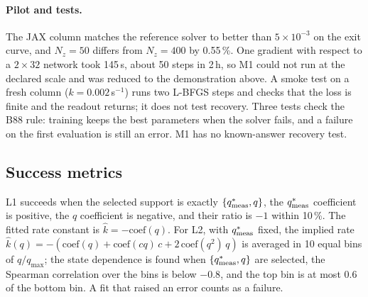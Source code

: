 \paragraph{Pilot and tests.} The JAX column matches the reference solver to better than
$5\times10^{-3}$ on the exit curve, and $N_z = 50$ differs from $N_z = 400$ by 0.55\,\%. One
gradient with respect to a $2\times32$ network took 145\,s, about 50 steps in 2\,h, so M1
could not run at the declared scale and was reduced to the demonstration above. A smoke test
on a fresh column ($k = 0.002$\,s$^{-1}$) runs two L-BFGS steps and checks that the loss is
finite and the readout returns; it does not test recovery. Three tests check the B88 rule:
training keeps the best parameters when the solver fails, and a failure on the first
evaluation is still an error. M1 has no known-answer recovery test.

\subsection*{Success metrics}
L1 succeeds when the selected support is exactly $\{q^{*}_{\mathrm{meas}}, q\}$, the $q^{*}_{\mathrm{meas}}$ coefficient is
positive, the $q$ coefficient is negative, and their ratio is $-1$ within 10\,\%. The fitted
rate constant is $\hat k = -\text{coef}(q)$. For L2, with $q^{*}_{\mathrm{meas}}$ fixed, the implied rate
$\hat k(q) = -(\text{coef}(q) + \text{coef}(cq)\,c + 2\,\text{coef}(q^2)\,q)$ is averaged in 10
equal bins of $q/q_{\max}$; the state dependence is found when $\{q^{*}_{\mathrm{meas}}, q\}$ are selected,
the Spearman correlation over the bins is below $-0.8$, and the top bin is at most 0.6 of the
bottom bin. A fit that raised an error counts as a failure.

